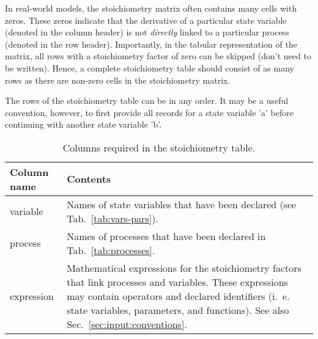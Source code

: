 \documentclass[a4paper]{article}
\begin{document}
In real-world models, the stoichiometry matrix often contains many cells with zeros. These zeros indicate that the derivative of a particular state variable (denoted in the column header) is not \emph{directly} linked to a particular process (denoted in the row header). Importantly, in the tabular representation of the matrix, all rows with a stoichiometry factor of zero can be skipped (don't need to be written). Hence, a complete stoichiometry table should consist of as many rows as there are non-zero cells in the stoichiometry matrix.

The rows of the stoichiometry table can be in any order. It may be a useful convention, however, to first provide all records for a state variable 'a' before continuing with another state variable 'b'.

\begin{table}[!h]
  \caption{Columns required in the stoichiometry table. \label{tab:stoichiometry}}
  \begin{tabular}{lp{}} \hline\hline
    \textbf{Column name} & \textbf{Contents} \\ \hline
    variable & Names of state variables that have been declared (see Tab.~\ref{tab:vars-pars}). \\
    process & Names of processes that have been declared in Tab.~\ref{tab:processes}. \\
    expression & Mathematical expressions for the stoichiometry factors that link processes and variables. These expressions may contain operators and declared identifiers (i.~e. state variables, parameters, and functions). See also Sec.~\ref{sec:input:conventions}. \\
    \hline
  \end{tabular}
\end{table}
\end{document}
